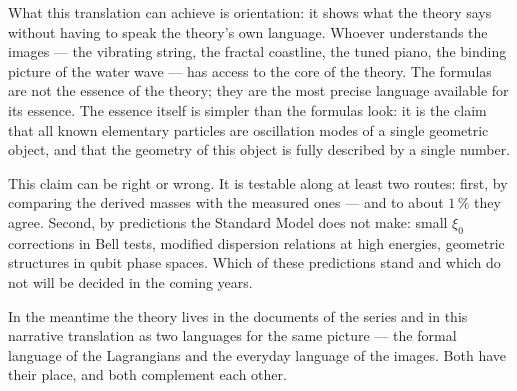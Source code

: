 What this translation can achieve is orientation: it shows what
the theory says without having to speak the theory's own language.
Whoever understands the images --- the vibrating string, the
fractal coastline, the tuned piano, the binding picture of the
water wave --- has access to the core of the theory. The formulas
are not the essence of the theory; they are the most precise
language available for its essence. The essence itself is simpler
than the formulas look: it is the claim that all known elementary
particles are oscillation modes of a single geometric object, and
that the geometry of this object is fully described by a single
number.

This claim can be right or wrong. It is testable along at least
two routes: first, by comparing the derived masses with the
measured ones --- and to about $1\,\%$ they agree. Second, by
predictions the Standard Model does not make: small $\xi_0$
corrections in Bell tests, modified dispersion relations at high
energies, geometric structures in qubit phase spaces. Which of
these predictions stand and which do not will be decided in the
coming years.

In the meantime the theory lives in the documents of the series
and in this narrative translation as two languages for the same
picture --- the formal language of the Lagrangians and the everyday
language of the images. Both have their place, and both complement
each other.
